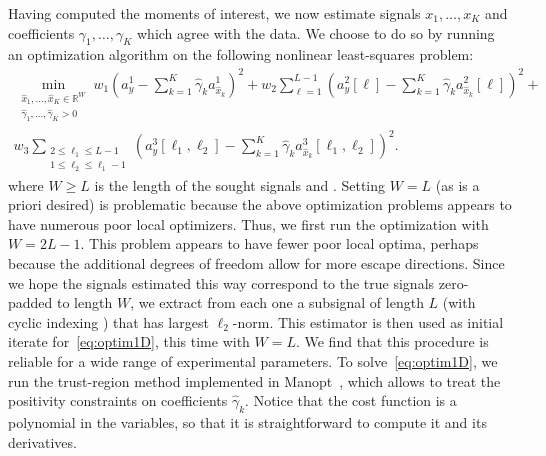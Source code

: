 \documentclass[english,11pt]{article}
\newcommand{\TODO}[1]{{\color{red}{[#1]}}}
\numberwithin{equation}{section}
\theoremstyle{plain}
\theoremstyle{definition}
\theoremstyle{remark}
\theoremstyle{plain}
\theoremstyle{remark}
\theoremstyle{plain}
\theoremstyle{plain}
\newcommand{\reals}{\mathbb{R}}
\begin{document}
Having computed the moments of interest, we now estimate signals $x_1, \ldots, x_K$ and coefficients $\gamma_1, \ldots, \gamma_K$ which agree with the data. We choose to do so by running an optimization algorithm on the following nonlinear least-squares problem:
\begin{multline}
\min_{\substack{\hat x_1, \ldots, \hat x_K \in \reals^{W} \\ \hat \gamma_1, \ldots, \hat \gamma_K > 0}} w_1 \left( a_y^1 - \sum_{k=1}^K \hat \gamma_k a_{\hat x_k}^1 \right)^2 + w_2 \sum_{\ell = 1}^{L-1} \left( a_y^2[\ell] - \sum_{k=1}^K \hat \gamma_k a_{\hat x_k}^2[\ell] \right)^2 + \\ w_3 \sum_{\substack{2\leq\ell_1\leq L-1 \\ 1 \leq \ell_2 \leq \ell_1-1}} \left( a_y^3[\ell_1, \ell_2] - \sum_{k=1}^K \hat \gamma_k a_{\hat x_k}^3[\ell_1,\ell_2] \right)^2.
\label{eq:optim1D}
\end{multline}
where $W \geq L$ is the length of the sought signals and \TODO{explain $w_i$'s: currently they are $w_1 = 1/2, w_2 = 1/2n_2, w_3 = 1/2n_3$, where $n_2, n_3$ are the number of moments used: $n_2 = L-1$, $n_3 = \frac{(L-1)(L-2)}{2}$. Issue is: this is not very smart..}. Setting $W = L$ (as is a priori desired) is problematic because the above optimization problems appears to have numerous poor local optimizers.
Thus, we first run the optimization with $W = 2L-1$. This problem appears to have fewer poor local optima, perhaps because the additional degrees of freedom allow for more escape directions. Since we hope the signals estimated this way correspond to the true signals zero-padded to length $W$, we extract from each one a subsignal of length $L$ (with cyclic indexing \TODO{we should understand / explain this}) that has largest $\ell_2$-norm. This estimator is then used as initial iterate for~\eqref{eq:optim1D}, this time with $W = L$. We find that this procedure is reliable for a wide range of experimental parameters. To solve~\eqref{eq:optim1D}, we run the trust-region method implemented in Manopt~\cite{manopt}, which allows to treat the positivity constraints \TODO{I might need a reference for this} on coefficients $\hat \gamma_k$. Notice that the cost function is a polynomial in the variables, so that it is straightforward to compute it and its derivatives.
\TODO{Should we do variable projection for the gammas, that is, exploit the fact the problem is a regular least squares in the gammas (up to the positivity constraints) to substitute the explicit optimum for them? Not sure it's worth the effort. -- Ok, it's probably not a good idea, because even with fixed gammas to the correct value, optimization takes a while.}
\TODO{Do we still need to stress at this point that the optimization part has complexity independent of length of observation? Should be pretty clear at this point already.}
\end{document}
